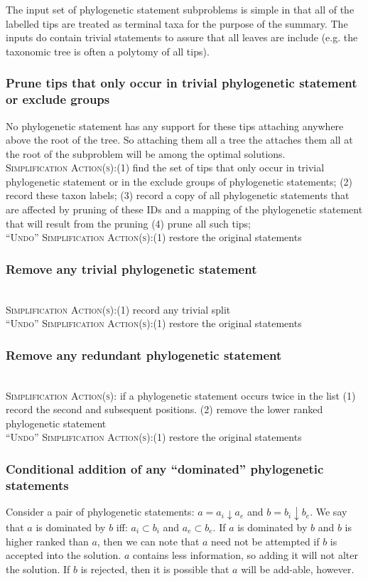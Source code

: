 \documentclass[11pt]{article}
\newcommand{\ps}{phylogenetic statement\xspace}
\newcommand{\pss}{phylogenetic statements\xspace}
\newcommand{\simplification}[0]{\\\noindent\textsc{Simplification Action(s)}:\xspace}
\newcommand{\undoActions}[0]{\\\noindent\textsc{``Undo'' Simplification Action(s)}:\xspace}
\newcommand{\vvps}[2]{\ensuremath{{#1}\downarrow{#2}}}
\begin{document}
The input set of \ps subproblems is simple in that all of the labelled tips are treated
    as terminal taxa for the purpose of the summary.
The inputs do contain trivial statements to assure that all leaves are include (e.g. 
     the taxonomic tree is often a polytomy of all tips).

\subsubsection{Prune tips that only occur in trivial \ps or exclude groups}
No \ps has any support for these tips attaching anywhere above the root of the tree.
So attaching them all a tree the attaches them all at the  root of the subproblem will
    be among the optimal solutions.
\simplification (1) find the set of tips that only occur in trivial \ps or in the exclude
    groups of \pss;
    (2) record these taxon labels;
    (3) record a copy of all \pss that are affected by pruning of these IDs and a mapping
        of the \ps that will result from the pruning
    (4) prune all such tips;
\undoActions (1) restore the original statements

\subsubsection{Remove any trivial \ps}
\simplification (1) record any trivial split
\undoActions (1) restore the original statements

\subsubsection{Remove any redundant \ps}
\simplification if a \ps occurs twice in the list (1) record the second and subsequent positions. (2) remove the lower ranked \ps
\undoActions (1) restore the original statements

\subsubsection{Conditional addition of any ``dominated'' \pss}
Consider a pair of \pss: $a=\vvps{a_i}{a_e}$ and $b=\vvps{b_i}{b_e}$.
We say that $a$ is dominated by $b$ iff: 
    $a_i \subset b_i$ and $a_e\subset b_e$.
If $a$ is dominated by $b$ and $b$ is higher ranked than $a$, then we can 
    note that $a$ need not be attempted if $b$ is accepted into the solution.
$a$ contains less information, so adding it will not alter the solution.
If $b$ is rejected, then it is possible that $a$ will be add-able, however.
\end{document}
